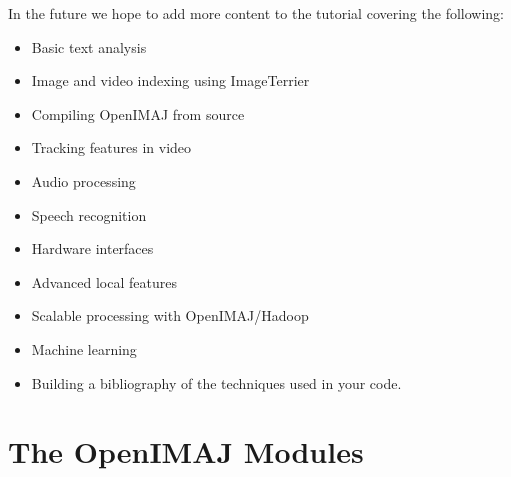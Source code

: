 In the future we hope to add more content to the tutorial covering the following:
\begin{itemize}
	\item Basic text analysis
	\item Image and video indexing using ImageTerrier
	\item Compiling OpenIMAJ from source
	\item Tracking features in video
	\item Audio processing
	\item Speech recognition
	\item Hardware interfaces
	\item Advanced local features
	\item Scalable processing with OpenIMAJ/Hadoop
	\item Machine learning
	\item Building a bibliography of the techniques used in your code.
\end{itemize}

\section*{The OpenIMAJ Modules}

